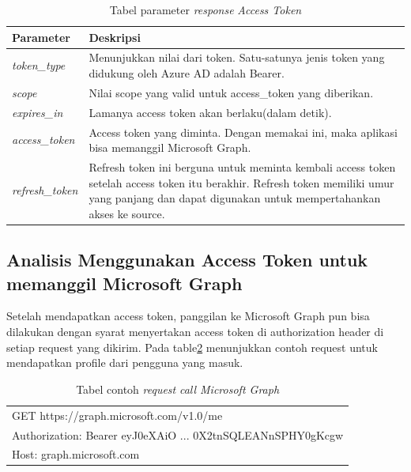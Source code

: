 \begin{table}[H]
	\centering 
	\caption{Tabel parameter \textit{response} \textit{Access Token}}
	\label{tab:parameter_response_access_token}
	\begin{tabular}{|p{3cm}|p{9cm}|}
	\toprule
	 \textbf{Parameter} & \textbf{Deskripsi}\\ \hline 
	\textit{token\_type} & Menunjukkan nilai dari token. Satu-satunya jenis token yang didukung oleh Azure AD adalah Bearer.\\ \hline 
	\textit{scope} & Nilai scope yang valid untuk access\_token yang diberikan.  \\ \hline 
	\textit{expires\_in} & Lamanya access token akan berlaku(dalam detik). \\ \hline  
	\textit{access\_token} & Access token yang diminta. Dengan memakai ini, maka aplikasi bisa memanggil Microsoft Graph. \\ \hline 
	\textit{refresh\_token} & Refresh token ini berguna untuk meminta kembali access token setelah access token itu berakhir. Refresh token memiliki umur yang panjang dan dapat digunakan untuk mempertahankan akses ke source. \\
	\bottomrule
	\end{tabular}  
\end{table}

\subsection{Analisis Menggunakan Access Token untuk memanggil Microsoft Graph}
\label{analisis_menggunakan_access_token}
Setelah mendapatkan access token, panggilan ke Microsoft Graph pun bisa dilakukan dengan syarat menyertakan access token di authorization header di setiap request yang dikirim. Pada table\ref{tab:contoh_request_call_microsoft_graph} menunjukkan contoh request untuk mendapatkan profile dari pengguna yang masuk. 

\begin{table}[H]
	\centering 
	\caption{Tabel contoh \textit{request} \textit{call Microsoft Graph}}
	\label{tab:contoh_request_call_microsoft_graph}
	\begin{tabular}{|p{9cm}|}
	\toprule
	GET https://graph.microsoft.com/v1.0/me \\
Authorization: Bearer eyJ0eXAiO ... 0X2tnSQLEANnSPHY0gKcgw\\
Host: graph.microsoft.com \\
	\bottomrule
	\end{tabular}  
\end{table}

